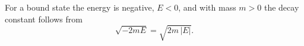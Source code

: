\documentclass{article}
\begin{document}
For a bound state the energy is negative, $E<0$, and with mass $m>0$ the decay constant follows from
\begin{equation}
\sqrt{-2 m E} = \sqrt{2 m\,|E|} .
\label{eq:kappa}
\end{equation}
\end{document}
